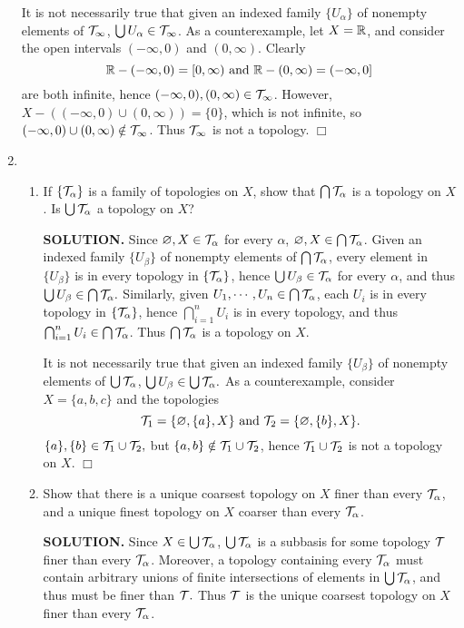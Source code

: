 \documentclass{article}
\begin{document}
\begin{enumerate}
    It is not necessarily true that given an indexed family $\{U_\alpha\}$ of nonempty elements of $\mathcal{T}_\infty$, $\bigcup U_\alpha \in \mathcal{T}_\infty$. As a counterexample, let $X = \mathbb{R}$, and consider the open intervals $(-\infty, 0)$ and $(0, \infty)$. Clearly
    $$\mathbb{R} - (-\infty, 0) = [0, \infty) \text{ and } \mathbb{R} - (0, \infty) = (-\infty, 0]$$
    are both infinite, hence $(-\infty, 0),(0, \infty) \in \mathcal{T}_\infty$. However, $X - ((-\infty, 0) \cup (0, \infty)) = \{0\}$, which is not infinite, so $(-\infty, 0) \cup (0, \infty) \notin \mathcal{T}_\infty$. Thus $\mathcal{T}_\infty$ is not a topology. $\Box$

    \item \begin{enumerate}
        \item If $\{\mathcal{T}_\alpha\}$ is a family of topologies on $X$, show that $\bigcap \mathcal{T}_\alpha$ is a topology on $X$. Is $\bigcup \mathcal{T}_\alpha$  a topology on $X$?

        {\bf SOLUTION.} Since $\varnothing, X \in \mathcal{T}_\alpha$ for every $\alpha$, $\varnothing, X \in \bigcap \mathcal{T}_\alpha$. Given an indexed family $\{U_\beta\}$ of nonempty elements of $\bigcap \mathcal{T}_\alpha$, every element in $\{U_\beta\}$ is in every topology in $\{\mathcal{T}_\alpha\}$, hence $\bigcup U_\beta \in \mathcal{T}_\alpha$ for every $\alpha$, and thus $\bigcup U_\beta \in \bigcap \mathcal{T}_\alpha.$ Similarly, given $U_1, \cdots, U_n \in \bigcap \mathcal{T}_\alpha$, each $U_i$ is in every topology in $\{\mathcal{T}_\alpha\}$, hence $\bigcap_{i=1}^n U_i$ is in every topology, and thus $\bigcap_{i=1}^nU_i \in \bigcap \mathcal{T}_\alpha$. Thus $\bigcap \mathcal{T}_\alpha$ is a topology on $X$.

        It is not necessarily true that given an indexed family $\{U_\beta\}$ of nonempty elements of $\bigcup \mathcal{T}_\alpha$, $\bigcup U_\beta \in \bigcup \mathcal{T}_\alpha.$ As a counterexample, consider $X = \{a, b, c\}$ and the topologies 
        $$\mathcal{T}_1 = \{\varnothing, \{a\}, X\} \text{ and } \mathcal{T}_2 = \{\varnothing, \{b\}, X\}.$$
        $\{a\}, \{b\} \in \mathcal{T}_1 \cup \mathcal{T}_2,$ but $\{a, b\} \notin \mathcal{T}_1 \cup \mathcal{T}_2$, hence $\mathcal{T}_1 \cup \mathcal{T}_2$ is not a topology on $X$. $\Box$
        
        \item Show that there is a unique coarsest topology on $X$ finer than every $\mathcal{T}_\alpha$, and a unique finest topology on $X$ coarser than every $\mathcal{T}_\alpha$.

        {\bf SOLUTION.} Since $X \in \bigcup \mathcal{T}_\alpha$, $\bigcup \mathcal{T}_\alpha$ is a subbasis for some topology $\mathcal{T}$ finer than every $\mathcal{T}_\alpha$. Moreover, a topology  containing every $\mathcal{T}_\alpha$ must contain arbitrary unions of finite intersections of elements in $\bigcup \mathcal{T}_\alpha$, and thus must be finer than $\mathcal{T}.$ Thus $\mathcal{T}$ is the unique coarsest topology on $X$ finer than every $\mathcal{T}_\alpha$.


\end{enumerate}
\end{enumerate}
\end{document}
